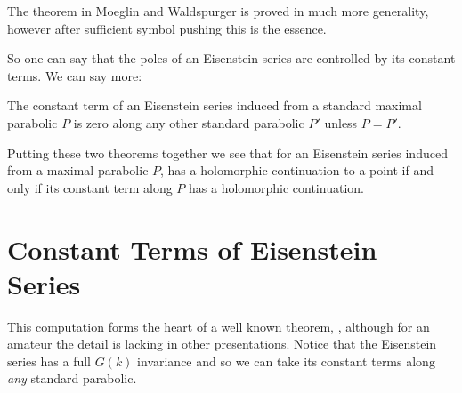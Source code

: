     \begin{remark}
    	The theorem in Moeglin and Waldspurger is proved in much more generality, however after sufficient symbol pushing this is the essence. 
    \end{remark}
    So one can say that the poles of an Eisenstein series are controlled by its constant terms. We can say more:
    
        
        \begin{theorem}
        	The constant term of an Eisenstein series induced from a standard maximal parabolic \(P\) is zero along any other standard parabolic \(P'\) unless \(P = P'\).
        \end{theorem}
        
        Putting these two theorems together we see that for an Eisenstein series induced from a maximal parabolic \(P\), has a holomorphic continuation to a point if and only if its constant term along \(P\) has a holomorphic continuation. 
      
      

\section{Constant Terms of Eisenstein Series}\label{const_eisenstein}
This computation forms the heart of a well known theorem, \cite[Prop 10.4.2]{getzIntroductionAutomorphicRepresentations2024}\cite[II.1.7]{moeglinSpectralDecompositionEisenstein1995}\cite[6.2]{shahidiEisensteinSeriesAutomorphic2010}, although for an amateur the detail is lacking in other presentations. Notice that the Eisenstein series has a full \(G(k)\) invariance and so we can take its constant terms along \textit{any} standard parabolic.

